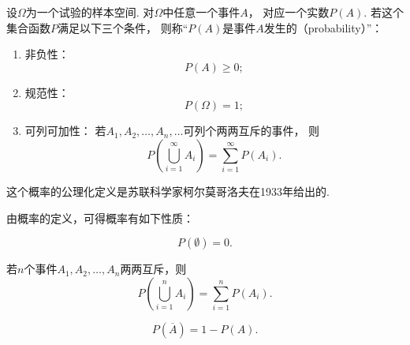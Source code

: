 \begin{definition}
设\(\Omega\)为一个试验的样本空间.
对\(\Omega\)中任意一个事件\(A\)，
对应一个实数\(P(A)\).
若这个集合函数\(P\)满足以下三个条件，
则称“\(P(A)\)是事件\(A\)发生的（probability）”：
\begin{enumerate}
	\item 非负性：
	\begin{equation}
	P(A) \geq 0;
	\end{equation}

	\item 规范性：
	\begin{equation}
	P(\Omega) = 1;
	\end{equation}

	\item 可列可加性：
	若\(A_1,A_2,\dotsc,A_n,\dotsc\)可列个两两互斥的事件，
	则\begin{equation}
		P\left(\bigcup_{i=1}^\infty A_i\right)
		= \sum\limits_{i=1}^\infty P(A_i).
	\end{equation}
\end{enumerate}
\end{definition}
这个概率的公理化定义是苏联科学家柯尔莫哥洛夫在1933年给出的.

由概率的定义，可得概率有如下性质：
\begin{property}
\begin{equation}
P(\emptyset) = 0.
\end{equation}
\end{property}

\begin{property}[有限可加性]
若\(n\)个事件\(A_1,A_2,\dotsc,A_n\)两两互斥，则\begin{equation}
P\left(\bigcup_{i=1}^n A_i\right)
= \sum\limits_{i=1}^n P(A_i).
\end{equation}
\end{property}

\begin{property}
\begin{equation}
P(\overline{A}) = 1 - P(A).
\end{equation}
\end{property}

